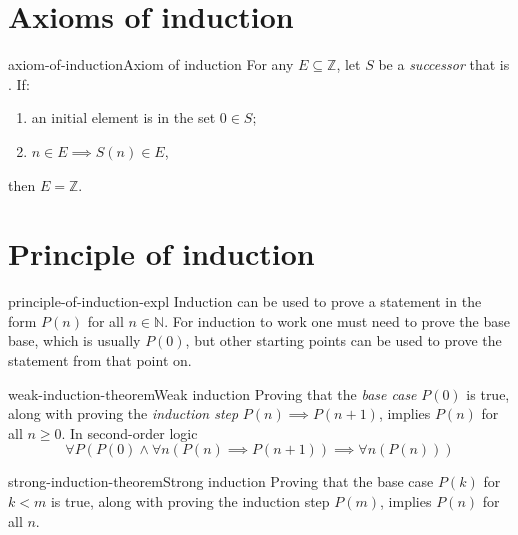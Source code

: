 \documentclass[preview]{standalone}
\begin{document}
\genpage

\section{Axioms of induction}

\begin{snippetaxiom}{axiom-of-induction}{Axiom of induction}
    For any \set \(E \subseteq \mathbb{Z}\), let
    \(S\) be a \textit{successor} \function that is \injective.
    If:
    \begin{enumerate}
        \item an initial element is in the set \(0 \in S\);
        \item \(n\in E \implies S(n) \in E\),
    \end{enumerate}
    then \(E = \mathbb{Z}\).
\end{snippetaxiom}


\section{Principle of induction}

\begin{snippet}{principle-of-induction-expl}
    Induction can be used to prove a statement in the form \(P(n)\)
    for all \(n \in \mathbb{N}\).
    For induction to work one must need to prove the base base, which is usually \(P(0)\),
    but other starting points can be used to prove the statement from that point on.
\end{snippet}

\begin{snippettheorem}{weak-induction-theorem}{Weak induction}
    Proving that the \textit{base case} \(P(0)\) is true,
    along with proving the \textit{induction step} \(P(n) \implies P(n+1)\), implies \(P(n)\)
    for all \(n \geq 0\). In second-order logic
    \[
        \forall P \left(
            P(0) \land \forall n \left( P(n) \implies P(n+1) \right)
            \implies \forall n \left( P(n) \right)
        \right)
    \]
\end{snippettheorem}

\begin{snippettheorem}{strong-induction-theorem}{Strong induction}
    Proving that the base case \(P(k)\) for \(k < m\) is true, along with
    proving the induction step \(P(m)\), implies \(P(n)\)
    for all \(n\).
\end{snippettheorem}
\end{document}
